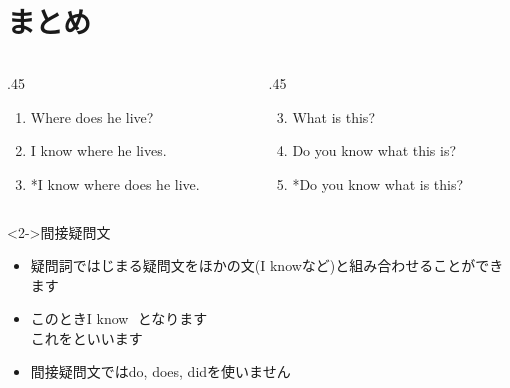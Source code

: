 \documentclass[aspectratio=169,xcolor={dvipsnames,table}]{beamer}
\begin{document}
\section{まとめ}
\begin{frame}[plain]
 
\begin{columns}[t]
 \begin{column}{.45\textwidth}  
\begin{enumerate}
 \item Where does he live?
 \item I know where he lives.
 \item[2'.] *I know where does he live.
\end{enumerate}
 \end{column}
 \begin{column}{.45\textwidth}  
 \begin{enumerate}\setcounter{enumi}{2}
  \item What is this?
   \item Do you know what this is?
  \item[4'.] *Do you know what is this?
 \end{enumerate}
 \end{column}
\end{columns}

\begin{block}<2->{間接疑問文}\small
 \begin{itemize}[square]
  \item 疑問詞ではじまる疑問文をほかの文(I knowなど)と組み合わせることができます\\
  \item このときI know \,\,となります\\
\mbox{}\hfill{\scriptsize {}これをといいます}  \item 間接疑問文ではdo, does, didを使いません
 \end{itemize}

\end{block}
\mbox{}\hfill{\scriptsize {}}

\end{frame}
\end{document}
